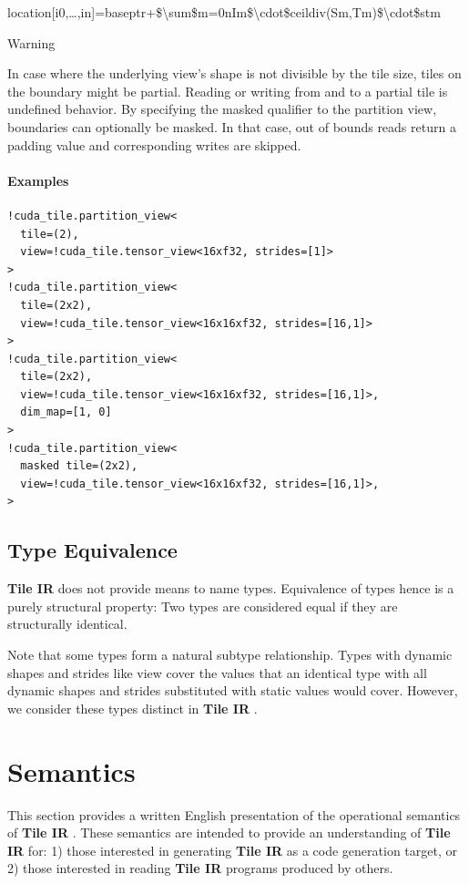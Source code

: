 \documentclass{article}
\begin{document}
location[i0,…,in]=baseptr+\$\textbackslash{}sum\$m=0nIm\$\textbackslash{}cdot\$ceildiv(Sm,Tm)\$\textbackslash{}cdot\$stm

Warning


In case where the underlying view's shape is not divisible by the tile size, tiles on the boundary might be partial. Reading or writing from and to a partial tile is undefined behavior. By specifying the masked qualifier to the partition view, boundaries can optionally be masked. In that case, out of bounds reads return a padding value and corresponding writes are skipped.



\paragraph{Examples}

\begin{lstlisting}
!cuda_tile.partition_view<
  tile=(2),
  view=!cuda_tile.tensor_view<16xf32, strides=[1]>
>
!cuda_tile.partition_view<
  tile=(2x2),
  view=!cuda_tile.tensor_view<16x16xf32, strides=[16,1]>
>
!cuda_tile.partition_view<
  tile=(2x2),
  view=!cuda_tile.tensor_view<16x16xf32, strides=[16,1]>,
  dim_map=[1, 0]
>
!cuda_tile.partition_view<
  masked tile=(2x2),
  view=!cuda_tile.tensor_view<16x16xf32, strides=[16,1]>,
>
\end{lstlisting}



\subsection{Type Equivalence}

\textbf{Tile IR} does not provide means to name types. Equivalence of types hence is a purely structural property: Two types are considered equal if they are structurally identical.


Note that some types form a natural subtype relationship. Types with dynamic shapes and strides like view cover the values that an identical type with all dynamic shapes and strides substituted with static values would cover. However, we consider these types distinct in \textbf{Tile IR} .


\newpage
\section{Semantics}

This section provides a written English presentation of the operational semantics of \textbf{Tile IR} . These semantics are intended to provide an understanding of \textbf{Tile IR} for: 1) those interested in generating \textbf{Tile IR} as a code generation target, or 2) those interested in reading \textbf{Tile IR} programs produced by others.
\end{document}
